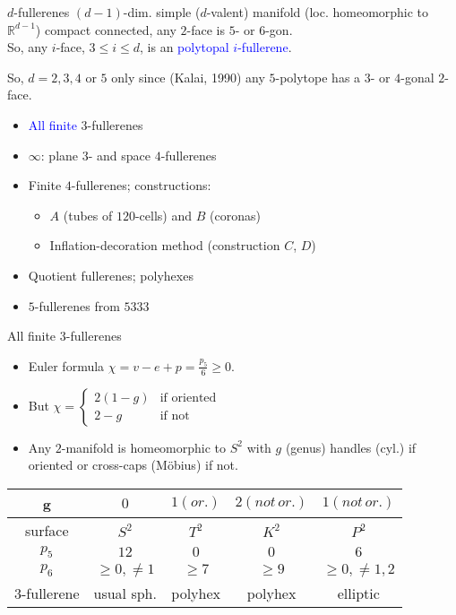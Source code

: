 \documentclass[%
pdf,
colorBG,
slideColor,
]{prosper}
\newcommand{\RR}{\ensuremath{\mathbb{R}}}
\begin{document}
\begin{slide}{$d$-fullerenes}
$(d-1)$-dim. simple ($d$-valent) manifold
(loc. homeomorphic to $\RR^{d-1}$) compact connected,
any $2$-face is $5$- or $6$-gon.\\
So, any $i$-face, $3\leq i\leq d$, is an \textcolor{blue}{polytopal $i$-fullerene}.

So, $d=2, 3, 4$ or $5$ only since (Kalai, 1990) any $5$-polytope has a $3$- or $4$-gonal $2$-face.

\begin{itemize}
\item \textcolor{blue}{All finite} $3$-fullerenes
\item $\infty$: plane $3$- and space $4$-fullerenes
\item Finite $4$-fullerenes; constructions:
\begin{itemize}
\item $A$ (tubes of $120$-cells) and $B$ (coronas)
\item Inflation-decoration method
(construction $C$, $D$)
\end{itemize}
\item Quotient fullerenes; polyhexes
\item $5$-fullerenes from $5333$
\end{itemize}
\end{slide}





\begin{slide}{All finite $3$-fullerenes}
\begin{itemize}
\item Euler formula $\chi=v-e+p=\frac{p_5}{6}\geq 0$.
\item But $\chi=\left\lbrace\begin{array}{rl}
2(1-g) &\mbox{if~oriented}\\
2-g    &\mbox{if~not}
\end{array}\right.$
\item Any $2$-manifold is homeomorphic to $S^2$ with $g$ (genus) handles (cyl.) if oriented or cross-caps (M\"obius) if not.
\end{itemize}

\begin{center}
\begin{tabular}{|c|c|c|c|c|}
\hline
g   & $0$   & $1(or.)$   &  $2 (not\, or.)$   &  $1(not\, or.)$\\
\hline
surface & $S^2$ & $T^2$ & $K^2$ &  $P^2$\\
\hline
$p_5$   & $12$  & $0$   &$0$    &  $6$\\
\hline
$p_6$   & $\geq 0, \not= 1$  & $\geq 7$  & $\geq 9$   &  $\geq 0, \not=1,2$\\
\hline
$3$-fullerene & usual sph. &polyhex  &polyhex   &elliptic\\
\hline
\end{tabular}
\end{center}



\end{slide}
\end{document}
